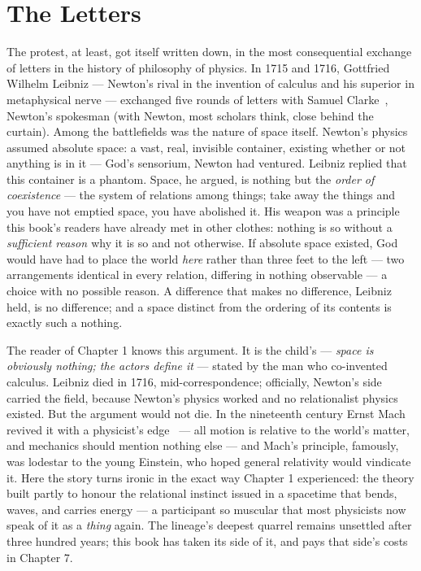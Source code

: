 \documentclass[fontsize=11pt,paper=a4,pagesize=auto,parskip=half-]{scrbook}
\newcommand{\Ixtmp}{}
\DeclareRobustCommand{\Ix}[1]{%
  #1%
  \begingroup
    \lowercase{\gdef\Ixtmp{#1}}%
    \expandafter\index\expandafter{\Ixtmp}%
  \endgroup}
\newcommand{\Iy}[1]{#1\index{#1}}
\begin{document}
\section{The Letters}

The protest, at least, got itself written down, in the most consequential exchange of letters in the history of philosophy of physics. In 1715 and 1716, Gottfried Wilhelm Leibniz --- Newton's rival in the invention of calculus and his superior in metaphysical nerve --- exchanged five rounds of letters with Samuel Clarke~\cite{leibnizclarke}, Newton's spokesman (with Newton, most scholars think, close behind the curtain). Among the battlefields was the nature of space itself. Newton's physics assumed absolute space: a vast, real, invisible container, existing whether or not anything is in it --- God's sensorium, Newton had ventured. Leibniz replied that this container is a phantom. Space, he argued, is nothing but the \emph{order of coexistence} --- the system of relations among things; take away the things and you have not emptied space, you have abolished it. His weapon was a principle this book's readers have already met in other clothes: nothing is so without a \emph{\Ix{sufficient reason}} why it is so and not otherwise. If absolute space existed, God would have had to place the world \emph{here} rather than three feet to the left --- two arrangements identical in every relation, differing in nothing observable --- a choice with no possible reason. A difference that makes no difference, Leibniz held, is no difference; and a space distinct from the ordering of its contents is exactly such a nothing.

The reader of Chapter 1 knows this argument. It is the child's --- \emph{space is obviously nothing; the actors define it} --- stated by the man who co-invented calculus. Leibniz died in 1716, mid-correspondence; officially, Newton's side carried the field, because Newton's physics worked and no relationalist physics existed. But the argument would not die. In the nineteenth century Ernst \Iy{Mach} revived it with a physicist's edge~\cite{mach1883} --- all motion is relative to the world's matter, and mechanics should mention nothing else --- and Mach's principle, famously, was lodestar to the young Einstein, who hoped general relativity would vindicate it. Here the story turns ironic in the exact way Chapter 1 experienced: the theory built partly to honour the relational instinct issued in a spacetime that bends, waves, and carries energy --- a participant so muscular that most physicists now speak of it as a \emph{thing} again. The lineage's deepest quarrel remains unsettled after three hundred years; this book has taken its side of it, and pays that side's costs in Chapter 7.
\end{document}
